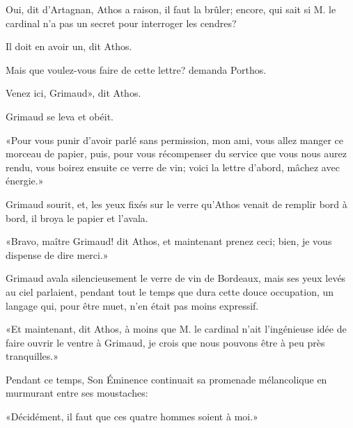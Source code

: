 \speak  Oui, dit d'Artagnan, Athos a raison, il faut la brûler; encore, qui sait si M. le cardinal n'a pas un secret pour interroger les cendres? 

\speak  Il doit en avoir un, dit Athos. 

\speak  Mais que voulez-vous faire de cette lettre? demanda Porthos. 

\speak  Venez ici, Grimaud», dit Athos. 

Grimaud se leva et obéit. 

«Pour vous punir d'avoir parlé sans permission, mon ami, vous allez manger ce morceau de papier, puis, pour vous récompenser du service que vous nous aurez rendu, vous boirez ensuite ce verre de vin; voici la lettre d'abord, mâchez avec énergie.» 

Grimaud sourit, et, les yeux fixés sur le verre qu'Athos venait de remplir bord à bord, il broya le papier et l'avala. 

«Bravo, maître Grimaud! dit Athos, et maintenant prenez ceci; bien, je vous dispense de dire merci.» 

Grimaud avala silencieusement le verre de vin de Bordeaux, mais ses yeux levés au ciel parlaient, pendant tout le temps que dura cette douce occupation, un langage qui, pour être muet, n'en était pas moins expressif. 

«Et maintenant, dit Athos, à moins que M. le cardinal n'ait l'ingénieuse idée de faire ouvrir le ventre à Grimaud, je crois que nous pouvons être à peu près tranquilles.» 

Pendant ce temps, Son Éminence continuait sa promenade mélancolique en murmurant entre ses moustaches: 

«Décidément, il faut que ces quatre hommes soient à moi.» 